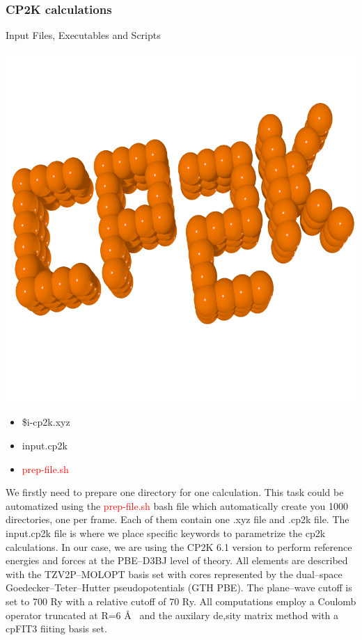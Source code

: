 \documentclass[12pt]{article}
\begin{document}
\subsubsection{CP2K calculations}
\begin{mybox2}{{Input Files, Executables and Scripts}}
\begin{minipage}[c]{0.5\linewidth}
\includegraphics[scale=0.1]{CP2K_logo.png}
\end{minipage}
\begin{minipage}[c]{0.5\linewidth}
\begin{itemize}
    \item \$i-cp2k.xyz
    \item input.cp2k
    \item \textcolor{red}{prep-file.sh}
\end{itemize}
\end{minipage}
\end{mybox2}
We firstly need to prepare one directory for one calculation. This task could be automatized using the \textcolor{red}{prep-file.sh} bash file which automatically create you 1000 directories, one per frame. Each of them contain one .xyz file and .cp2k file. The input.cp2k file is where we place specific keywords to parametrize the cp2k calculations. In our case, we are using the CP2K 6.1 version to perform reference energies and forces at the PBE--D3BJ level of theory. All elements are described with the TZV2P--MOLOPT basis set with cores represented by the dual--space Goedecker--Teter--Hutter pseudopotentials (GTH PBE). The plane--wave cutoff is set to 700 Ry with a relative cutoff of 70 Ry. All computations employ a Coulomb operator truncated at R=6 \AA~ and the auxilary de,sity matrix method with a cpFIT3 fiiting basis set. \\ \\
\end{document}

